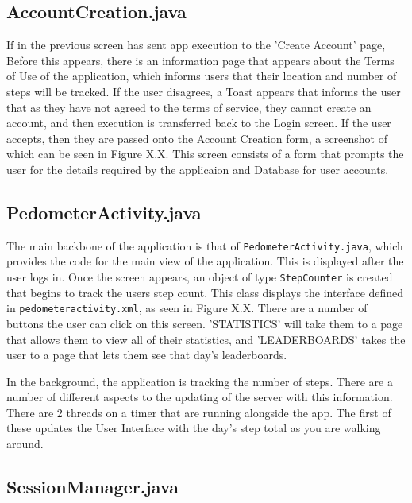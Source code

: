 \documentclass{l4proj}
\begin{document}
\subsection{AccountCreation.java}

If in the previous screen has sent app execution to the 'Create Account' page, Before this appears, there is an information page that appears about the Terms of Use of the application, which informs users that their location and number of steps will be tracked. If the user disagrees, a Toast appears that informs the user that as they have not agreed to the terms of service, they cannot create an account, and then execution is transferred back to the Login screen. If the user accepts, then they are passed onto the Account Creation form, a screenshot of which can be seen in Figure X.X. This screen consists of a form that prompts the user for the details required by the applicaion and Database for user accounts. 

\subsection{PedometerActivity.java}

The main backbone of the application is that of \texttt{PedometerActivity.java}, which provides the code for the main view of the application. This is displayed after the user logs in. Once the screen appears, an object of type \texttt{StepCounter} is created that begins to track the users step count. This class displays the interface defined in \texttt{pedometeractivity.xml}, as seen in Figure X.X. There are a number of buttons the user can click on this screen. 'STATISTICS' will take them to a page that allows them to view all of their statistics, and 'LEADERBOARDS' takes the user to a page that lets them see that day's leaderboards. 

In the background, the application is tracking the number of steps. There are a number of different aspects to the updating of the server with this information. There are 2 threads on a timer that are running alongside the app. The first of these updates the User Interface with the day's step total as you are walking around. 

\subsection{SessionManager.java}
\end{document}
